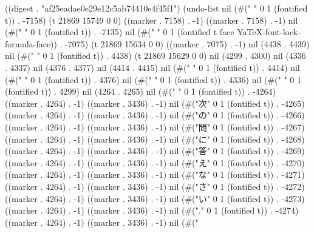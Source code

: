 
((digest . "af25eadae0e29e12c5ab74410e4f45f1") (undo-list nil (#(" " 0 1 (fontified t)) . -7158) (t 21869 15749 0 0) ((marker . 7158) . -1) ((marker . 7158) . -1) nil (#(" " 0 1 (fontified t)) . -7135) nil (#(" " 0 1 (fontified t face YaTeX-font-lock-formula-face)) . -7075) (t 21869 15634 0 0) ((marker . 7075) . -1) nil (4438 . 4439) nil (#("	" 0 1 (fontified t)) . 4438) (t 21869 15629 0 0) nil (4299 . 4300) nil (4336 . 4337) nil (4376 . 4377) nil (4414 . 4415) nil (#("	" 0 1 (fontified t)) . 4414) nil (#("	" 0 1 (fontified t)) . 4376) nil (#("	" 0 1 (fontified t)) . 4336) nil (#("	" 0 1 (fontified t)) . 4299) nil (4264 . 4265) nil (#(" " 0 1 (fontified t)) . -4264) ((marker . 4264) . -1) ((marker . 3436) . -1) nil (#("次" 0 1 (fontified t)) . -4265) ((marker . 4264) . -1) ((marker . 3436) . -1) nil (#("の" 0 1 (fontified t)) . -4266) ((marker . 4264) . -1) ((marker . 3436) . -1) nil (#("問" 0 1 (fontified t)) . -4267) ((marker . 4264) . -1) ((marker . 3436) . -1) nil (#("に" 0 1 (fontified t)) . -4268) ((marker . 4264) . -1) ((marker . 3436) . -1) nil (#("答" 0 1 (fontified t)) . -4269) ((marker . 4264) . -1) ((marker . 3436) . -1) nil (#("え" 0 1 (fontified t)) . -4270) ((marker . 4264) . -1) ((marker . 3436) . -1) nil (#("な" 0 1 (fontified t)) . -4271) ((marker . 4264) . -1) ((marker . 3436) . -1) nil (#("さ" 0 1 (fontified t)) . -4272) ((marker . 4264) . -1) ((marker . 3436) . -1) nil (#("い" 0 1 (fontified t)) . -4273) ((marker . 4264) . -1) ((marker . 3436) . -1) nil (#("." 0 1 (fontified t)) . -4274) ((marker . 4264) . -1) ((marker . 3436) . -1) nil (#("
